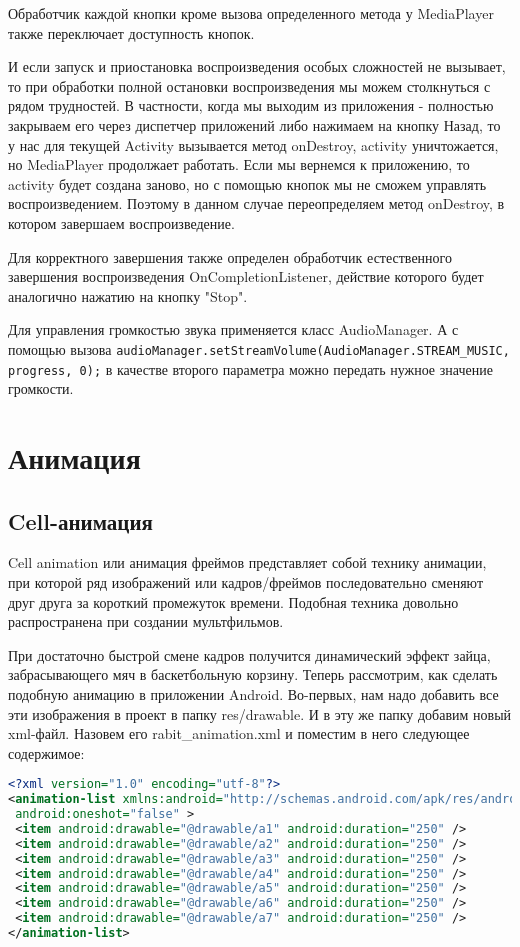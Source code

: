 Обработчик каждой кнопки кроме вызова определенного метода у
MediaPlayer также переключает доступность кнопок.\par
И если запуск и приостановка воспроизведения особых сложностей не
вызывает, то при обработки полной остановки воспроизведения мы можем
столкнуться с рядом трудностей. В частности, когда мы выходим из
приложения - полностью закрываем его через диспетчер приложений либо
нажимаем на кнопку Назад, то у нас для текущей Activity вызывается метод
onDestroy, activity уничтожается, но MediaPlayer продолжает работать. Если
мы вернемся к приложению, то activity будет создана заново, но с помощью
кнопок мы не сможем управлять воспроизведением. Поэтому в данном
случае переопределяем метод onDestroy, в котором завершаем
воспроизведение.\par
Для корректного завершения также определен обработчик естественного
завершения воспроизведения OnCompletionListener, действие которого
будет аналогично нажатию на кнопку "Stop".\par
Для управления громкостью звука применяется класс AudioManager.
А с помощью вызова
\texttt{audioManager.setStreamVolume(AudioManager.STREAM\_MUSIC,
progress, 0);} в качестве второго параметра можно передать нужное значение
громкости.

\section{Анимация}
\subsection{Cell-анимация}
Cell animation или анимация фреймов представляет собой технику анимации,
при которой ряд изображений или кадров/фреймов последовательно сменяют
друг друга за короткий промежуток времени. Подобная техника довольно
распространена при создании мультфильмов.\par
При достаточно быстрой смене кадров получится динамический эффект
зайца, забрасывающего мяч в баскетбольную корзину. Теперь рассмотрим,
как сделать подобную анимацию в приложении Android.
Во-первых, нам надо добавить все эти изображения в проект в папку
res/drawable. И в эту же папку добавим новый xml-файл. Назовем его
rabit\_animation.xml и поместим в него следующее содержимое:

\begin{lstlisting}[language=XML
	, label=lst:
	]
<?xml version="1.0" encoding="utf-8"?>
<animation-list xmlns:android="http://schemas.android.com/apk/res/android"
 android:oneshot="false" >
 <item android:drawable="@drawable/a1" android:duration="250" />
 <item android:drawable="@drawable/a2" android:duration="250" />
 <item android:drawable="@drawable/a3" android:duration="250" />
 <item android:drawable="@drawable/a4" android:duration="250" />
 <item android:drawable="@drawable/a5" android:duration="250" />
 <item android:drawable="@drawable/a6" android:duration="250" />
 <item android:drawable="@drawable/a7" android:duration="250" />
</animation-list>
\end{lstlisting}

